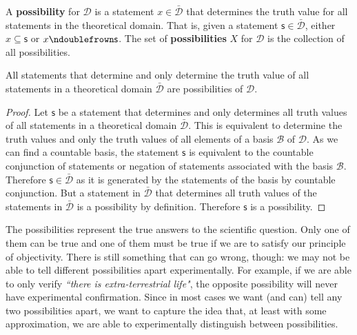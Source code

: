 \documentclass[11pt,letterpaper,fleqn]{memoir} %
\begin{document}
\begin{mathSection}

\begin{defn}
	A \textbf{possibility} for $\mathcal{D}$ is a statement $x \in \bar{\mathcal{D}}$ that determines the truth value for all statements in the theoretical domain. That is, given a statement $\mathsf{s} \in \bar{\mathcal{D}}$, either $x \subseteq \mathsf{s}$ or $x \ncomp \mathsf{s}$. The set of \textbf{possibilities} $X$ for $\mathcal{D}$ is the collection of all possibilities.
\end{defn}

\begin{prop}
	All statements that determine and only determine the truth value of all statements in a theoretical domain $\bar{\mathcal{D}}$ are possibilities of $\mathcal{D}$.
\end{prop}

\begin{proof}
	Let $\mathsf{s}$ be a statement that determines and only determines all truth values of all statements in a theoretical domain $\bar{\mathcal{D}}$. This is equivalent to determine the truth values and only the truth values of all elements of a basis $\mathcal{B}$ of $\mathcal{D}$. As we can find a countable basis, the statement $\mathsf{s}$ is equivalent to the countable conjunction of statements or negation of statements associated with the basis $\mathcal{B}$. Therefore $\mathsf{s} \in \bar{\mathcal{D}}$ as it is generated by the statements of the basis by countable conjunction. But a statement in $\bar{\mathcal{D}}$ that determines all truth values of the statements in $\bar{\mathcal{D}}$ is a possibility by definition. Therefore $\mathsf{s}$ is a possibility.
\end{proof}
\end{mathSection}

The possibilities represent the true answers to the scientific question. Only one of them can be true and one of them must be true if we are to satisfy our principle of objectivity. There is still something that can go wrong, though: we may not be able to tell different possibilities apart experimentally. For example, if we are able to only verify \emph{``there is extra-terrestrial life"}, the opposite possibility will never have experimental confirmation. Since in most cases we want (and can) tell any two possibilities apart, we want to capture the idea that, at least with some approximation, we are able to experimentally distinguish between possibilities.
\end{document}

